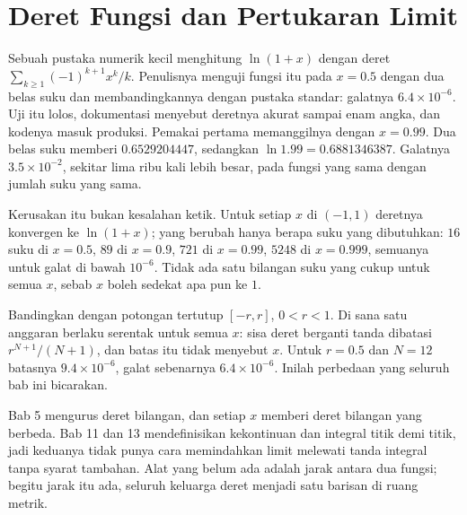 \chapter{Deret Fungsi dan Pertukaran Limit}

Sebuah pustaka numerik kecil menghitung $\ln(1+x)$ dengan deret
$\sum_{k\ge 1}(-1)^{k+1}x^{k}/k$. Penulisnya menguji fungsi itu pada $x=0.5$
dengan dua belas suku dan membandingkannya dengan pustaka standar: galatnya
$6.4\times 10^{-6}$. Uji itu lolos, dokumentasi menyebut deretnya akurat sampai
enam angka, dan kodenya masuk produksi. Pemakai pertama memanggilnya dengan
$x=0.99$. Dua belas suku memberi $0.6529204447$, sedangkan
$\ln 1.99=0.6881346387$. Galatnya $3.5\times10^{-2}$, sekitar lima ribu kali
lebih besar, pada fungsi yang sama dengan jumlah suku yang sama.

Kerusakan itu bukan kesalahan ketik. Untuk setiap $x$ di $(-1,1)$ deretnya
konvergen ke $\ln(1+x)$; yang berubah hanya berapa suku yang dibutuhkan: $16$
suku di $x=0.5$, $89$ di $x=0.9$, $721$ di $x=0.99$, $5248$ di $x=0.999$,
semuanya untuk galat di bawah $10^{-6}$. Tidak ada satu bilangan suku yang cukup
untuk semua $x$, sebab $x$ boleh sedekat apa pun ke $1$.

Bandingkan dengan potongan tertutup $[-r,r]$, $0<r<1$. Di sana satu anggaran
berlaku serentak untuk semua $x$: sisa deret berganti tanda dibatasi
$r^{N+1}/(N+1)$, dan batas itu tidak menyebut $x$. Untuk $r=0.5$ dan $N=12$
batasnya $9.4\times10^{-6}$, galat sebenarnya $6.4\times10^{-6}$. Inilah
perbedaan yang seluruh bab ini bicarakan.

Bab 5 mengurus deret bilangan, dan setiap $x$ memberi deret bilangan yang
berbeda. Bab 11 dan 13 mendefinisikan kekontinuan dan integral titik demi titik,
jadi keduanya tidak punya cara memindahkan limit melewati tanda integral tanpa
syarat tambahan. Alat yang belum ada adalah jarak antara dua fungsi; begitu
jarak itu ada, seluruh keluarga deret menjadi satu barisan di ruang metrik.

